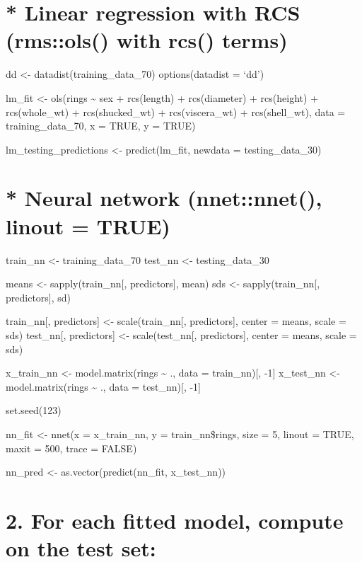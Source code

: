 \documentclass[
  letterpaper,
  DIV=11,
  numbers=noendperiod]{scrreprt}
\begin{document}
{

\chapter{* Linear regression with RCS (rms::ols() with rcs()
terms)}\label{linear-regression-with-rcs-rmsols-with-rcs-terms}

dd \textless- datadist(training\_data\_70) options(datadist = `dd')

lm\_fit \textless- ols(rings \textasciitilde{} sex + rcs(length) +
rcs(diameter) + rcs(height) + rcs(whole\_wt) + rcs(shucked\_wt) +
rcs(viscera\_wt) + rcs(shell\_wt), data = training\_data\_70, x = TRUE,
y = TRUE)

lm\_testing\_predictions \textless- predict(lm\_fit, newdata =
testing\_data\_30)


\chapter{* Neural network (nnet::nnet(), linout =
TRUE)}\label{neural-network-nnetnnet-linout-true}

train\_nn \textless- training\_data\_70 test\_nn \textless-
testing\_data\_30

means \textless- sapply(train\_nn{[}, predictors{]}, mean) sds
\textless- sapply(train\_nn{[}, predictors{]}, sd)

train\_nn{[}, predictors{]} \textless- scale(train\_nn{[},
predictors{]}, center = means, scale = sds) test\_nn{[}, predictors{]}
\textless- scale(test\_nn{[}, predictors{]}, center = means, scale =
sds)

x\_train\_nn \textless- model.matrix(rings \textasciitilde{} ., data =
train\_nn){[}, -1{]} x\_test\_nn \textless- model.matrix(rings
\textasciitilde{} ., data = test\_nn){[}, -1{]}

set.seed(123)

nn\_fit \textless- nnet(x = x\_train\_nn, y = train\_nn\$rings, size =
5, linout = TRUE, maxit = 500, trace = FALSE)

nn\_pred \textless- as.vector(predict(nn\_fit, x\_test\_nn))


\chapter{2. For each fitted model, compute on the test
set:}\label{for-each-fitted-model-compute-on-the-test-set}

}
\end{document}
